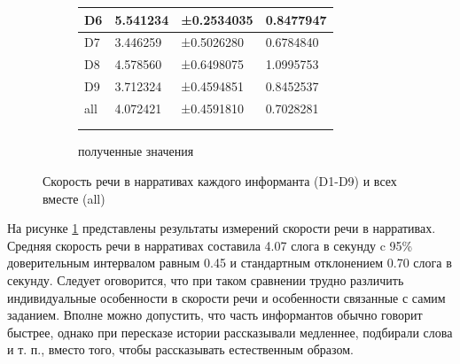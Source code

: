 \begin{figure}[t]
\begin{subfigure}[b]{0.45\textwidth}
\begin{tabular}{|l|l|l|l|}
D6 & 5.541234 & ±0.2534035 & 0.8477947 \\ \hline
D7 & 3.446259 & ±0.5026280 & 0.6784840 \\ \hline
D8 & 4.578560 & ±0.6498075 & 1.0995753 \\ \hline
D9 & 3.712324 & ±0.4594851 & 0.8452537 \\ \hline
all & 4.072421 & ±0.4591810 & 0.7028281 \\ \hline
\multicolumn{1}{c}{}&\multicolumn{1}{c}{}&\multicolumn{1}{c}{}&\multicolumn{1}{c}{}\\
\multicolumn{1}{c}{}&\multicolumn{1}{c}{}&\multicolumn{1}{c}{}&\multicolumn{1}{c}{}\\
\end{tabular}
\normalsize
\caption{полученные значения}        
\end{subfigure}
\caption{Скорость речи в нарративах каждого информанта (D1-D9) и всех вместе (all)}
\label{narrativeboxplot}
\end{figure}
\par На рисунке \ref{narrativeboxplot} представлены результаты измерений скорости речи в нарративах. Средняя скорость речи в нарративах составила 4.07 слога в секунду c 95\% доверительным интервалом равным 0.45 и стандартным отклонением 0.70 слога в секунду. Следует оговорится, что при таком сравнении трудно различить индивидуальные особенности в скорости речи и особенности связанные с самим заданием. Вполне можно допустить, что часть информантов обычно говорит быстрее, однако при пересказе истории рассказывали медленнее, подбирали слова и т. п., вместо того, чтобы рассказывать естественным образом.

